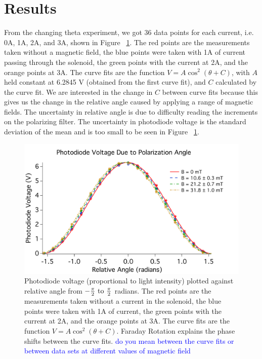 \documentclass[prb,preprint]{revtex4-1}
\begin{document}
\section{Results}

From the changing theta experiment, we got 36 data points for each current, i.e. 0A, 1A, 2A, and 3A, shown in Figure ~\ref{V_ThetaRel_Plot}. The red points are the measurements taken without a magnetic field, the blue points were taken with 1A of current passing through the solenoid, the green points with the current at 2A, and the orange points at 3A.  The curve fits are the function $V = A \cos^{2}(\theta + C)$, with $A$ held constant at 6.2845 V (obtained from the first curve fit), and $C$ calculated by the curve fit. We are interested in the change in $C$ between curve fits because this gives us the change in the relative angle caused by applying a range of magnetic fields. The uncertainty in relative angle is due to difficulty reading the increments on the polarizing filter. The uncertainty in photodiode voltage is the standard deviation of the mean and is too small to be seen in Figure ~\ref{V_ThetaRel_Plot}.

\begin{figure}[h!]
\centering

\includegraphics[width=6in]{V_ThetaRel_Plot.pdf}
\caption{Photodiode voltage (proportional to light intensity) plotted against relative angle from $-\frac{\pi}{2} \rm{\ to\ } \frac{\pi}{2}$ radians.  The red points are the measurements taken without a current in the solenoid, the blue points were taken with 1A of current, the green points with the current at 2A, and the orange points at 3A.  The curve fits are the function $V = A \cos^{2}(\theta + C) $. Faraday Rotation explains the phase shifts between the curve fits. \textcolor{blue}{do you mean between the curve fits or between data sets at different values of magnetic field}}

\label{V_ThetaRel_Plot}
\end{figure}
\end{document}
